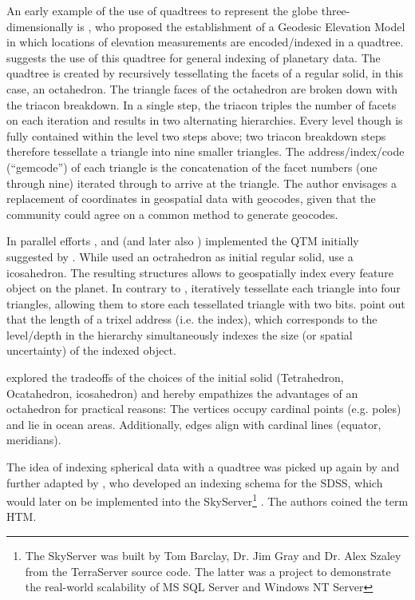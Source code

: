 \documentclass[a4paper,10pt]{article}
\begin{document}
An early example of the use of quadtrees to represent the globe three-dimensionally is \cite{Dutton1984}, who proposed the establishment of a Geodesic Elevation Model in which locations of elevation measurements are encoded/indexed in a quadtree. 
\cite{Dutton1989} suggests the use of this quadtree for general indexing of planetary data.
The quadtree is created by recursively tessellating the facets of a regular solid, in this case, an octahedron.
The triangle faces of the octahedron are broken down with the triacon breakdown. In a single step, the triacon triples the number of facets on each iteration and results in two alternating hierarchies. Every level though is fully contained within the level two steps above; two triacon breakdown steps therefore tessellate a triangle into nine smaller triangles. The address/index/code (``gemcode'') of each triangle is the concatenation of the facet numbers (one through nine) iterated through to arrive at the triangle. The author envisages a replacement of coordinates in geospatial data with geocodes, given that the community could agree on a common method to generate geocodes.

In parallel efforts \cite{Fekete1990, Fekete1990a}, and \cite{Goodchild1992} (and later also \cite{Lugo1995}) implemented the \gls{QTM} initially suggested by \cite{Dutton1984}. While \cite{Goodchild1992} used an octrahedron as initial regular solid, \cite{Fekete1990, Fekete1990a} use a icosahedron.
The resulting structures allows to geospatially index every feature object on the planet. 
In contrary to \cite{Dutton1984}, \cite{Fekete1990, Fekete1990a, Goodchild1992, Lugo1995} iteratively tessellate each triangle into four triangles, allowing them to store each tessellated triangle with two bits.
\cite{Goodchild1992} point out that the length of a trixel address (i.e. the index), which corresponds to the level/depth in the hierarchy simultaneously indexes the size (or spatial uncertainty) of the indexed object.

\cite{Dutton1996} explored the tradeoffs of the choices of the initial solid (Tetrahedron, Ocatahedron, icosahedron) and hereby empathizes the advantages of an octahedron for practical reasons: The vertices occupy cardinal points (e.g. poles) and lie in ocean areas. Additionally, edges align with cardinal lines (equator, meridians).

The idea of indexing spherical data with a quadtree was picked up again by \cite{Barret1995} and further adapted by \cite{Kunszt2000, Kunszt2001, Szalay2005}, who developed an indexing schema for the \gls{SDSS}, which would later on be implemented into the SkyServer\footnote{The SkyServer was built by Tom Barclay, Dr. Jim Gray and Dr. Alex Szaley from the TerraServer \citep{Barclay1998, Slutz1999} source code. The latter was a project to demonstrate the real-world scalability of MS SQL Server and Windows NT Server} \citep{Szalay2002, Thakar2003}.
The authors coined the term \gls{HTM}.
\end{document}

